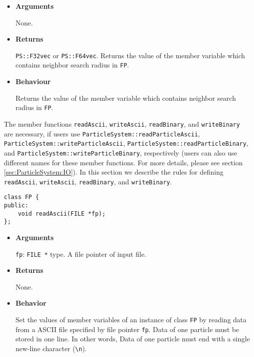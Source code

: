 \begin{itemize}

\item {\bf Arguments}

  None.

\item {\bf Returns}

  \texttt{PS::F32vec} or \texttt{PS::F64vec}.
  Returns the value of the member variable which contains neighbor search radius in \texttt{FP}.

\item {\bf Behaviour}

  Returns the value of the member variable which contains neighbor search radius in \texttt{FP}.
  
\end{itemize}

\label{sec:userdefined_fullparticle_io}


The member functions \texttt{readAscii}, \texttt{writeAscii}, \texttt{readBinary}, and \texttt{writeBinary} are necessary, if users use \texttt{ParticleSystem::readParticleAscii}, \texttt{ParticleSystem::writeParticleAscii}, \texttt{ParticleSystem::readParticleBinary}, and \texttt{ParticleSystem::writeParticleBinary}, respectively  (users can also use different names for these member functions. For more details, please see section \ref{sec:ParticleSystem:IO}).  In this section we describe the rules for defining \texttt{readAscii}, \texttt{writeAscii}, \texttt{readBinary}, and \texttt{writeBinary}.

\label{sec:FP_readAscii}

\begin{screen}
\begin{verbatim}
class FP {
public:
    void readAscii(FILE *fp);
};
\end{verbatim}
\end{screen}

\begin{itemize}

\item {\bf Arguments}

  \texttt{fp}: \texttt{FILE *} type. A file pointer of input file.

\item {\bf Returns}

  None.
  
\item {\bf Behavior}

  Set the values of member variables of an instance of class \texttt{FP} by reading data from a ASCII file specified by file pointer \texttt{fp}. Data of one particle must be stored in one line. In other words, Data of one particle must end with a single new-line character (\texttt{\textbackslash n}).
  
\end{itemize}

